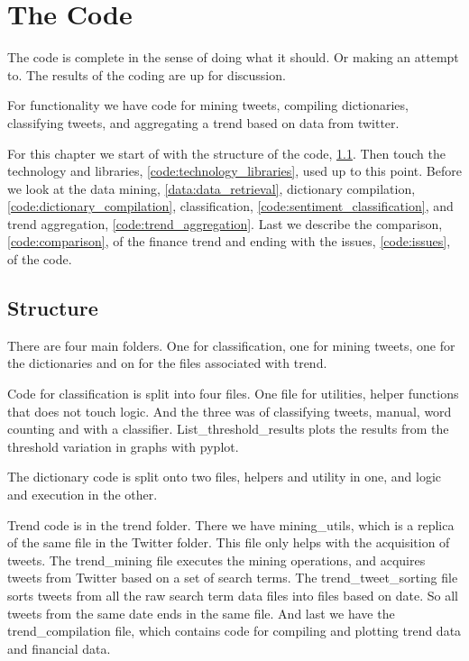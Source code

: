 \chapter{The Code}\label{code}
The code is complete in the sense of doing what it should. Or making an attempt
to. The results of the coding are up for discussion.

For functionality we have code for mining tweets, compiling dictionaries,
classifying tweets, and aggregating a trend based on data from twitter.  

For this chapter we start of with the structure of the code,
\ref{code:structure}. Then touch the technology and libraries,
\ref{code:technology_libraries}, used up to this point. Before we look at the
data mining, \ref{data:data_retrieval}, dictionary compilation,
\ref{code:dictionary_compilation}, classification,
\ref{code:sentiment_classification}, and trend aggregation,
\ref{code:trend_aggregation}. Last we describe the comparison,
\ref{code:comparison}, of the finance trend and ending with the issues,
\ref{code:issues}, of the code.  

\section{Structure}\label{code:structure}
There are four main folders. One for classification, one for mining tweets, one
for the dictionaries and on for the files associated with trend. 

Code for classification is split into four files. One file for utilities,
helper functions that does not touch logic. And the three was of classifying
tweets, manual, word counting and with a classifier. List\_threshold\_results
plots the results from the threshold variation in graphs with pyplot. 

The dictionary code is split onto two files, helpers and utility in one, and
logic and execution in the other. 

Trend code is in the trend folder. There we have mining\_utils, which is a
replica of the same file in the Twitter folder. This file only helps with the
acquisition of tweets. The trend\_mining file executes the mining operations,
and acquires tweets from Twitter based on a set of search terms. The
trend\_tweet\_sorting file sorts tweets from all the raw search term data files
into files based on date. So all tweets from the same date ends in the same
file. And last we have the trend\_compilation file, which contains code for
compiling and plotting trend data and financial data.  


